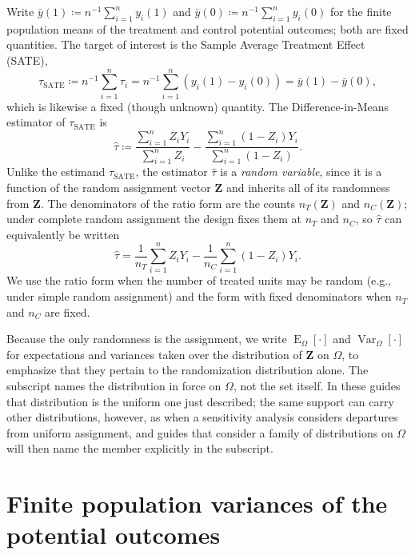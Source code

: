 \documentclass[12pt,leqno]{article}
\theoremstyle{newstyle}
\DeclareMathOperator{\E}{\mathrm{E}}
\DeclareMathOperator{\Var}{\mathrm{Var}}
\newcommand{\bZ}{\bm{Z}}   \newcommand{\bz}{\bm{z}}   %
\newcommand{\EZ}{\E_{\Omega}}    \newcommand{\VarZ}{\Var_{\Omega}}  %
\newcommand{\po}[2]{y_{#1}(#2)}     %
\newcommand{\ybar}[1]{\bar{y}(#1)}  %
\newcommand{\tauS}{\tau_{\text{SATE}}}
\newcommand{\tauhat}{\hat{\tau}}
\begin{document}
Write $\ybar{1} \coloneqq n^{-1} \sum_{i = 1}^n \po{i}{1}$ and $\ybar{0} \coloneqq n^{-1} \sum_{i = 1}^n \po{i}{0}$ for the finite population means of the treatment and control potential outcomes; both are fixed quantities. The target of interest is the Sample Average Treatment Effect (SATE),
\begin{equation*}
\tauS \coloneqq n^{-1} \sum \limits_{i = 1}^n \tau_i = n^{-1} \sum \limits_{i = 1}^n \left(\po{i}{1} - \po{i}{0}\right) = \ybar{1} - \ybar{0},
\end{equation*}
which is likewise a fixed (though unknown) quantity. The Difference-in-Means estimator of $\tauS$ is
\begin{equation*}
\tauhat \coloneqq \dfrac{\sum \limits_{i = 1}^n Z_i Y_i}{\sum\limits_{i = 1}^n Z_i}  - \dfrac{\sum \limits_{i = 1}^n \left(1 - Z_i\right) Y_i}{\sum\limits_{i = 1}^n \left(1 - Z_i\right)}.
\end{equation*}
Unlike the estimand $\tauS$, the estimator $\tauhat$ is a \textit{random variable}, since it is a function of the random assignment vector $\bZ$ and inherits all of its randomness from $\bZ$. The denominators of the ratio form are the counts $n_T(\bZ)$ and $n_C(\bZ)$; under complete random assignment the design fixes them at $n_T$ and $n_C$, so $\tauhat$ can equivalently be written
\begin{equation*}
\tauhat = \dfrac{1}{n_T} \sum \limits_{i = 1}^n Z_i Y_i - \dfrac{1}{n_C} \sum \limits_{i = 1}^n \left(1 - Z_i\right) Y_i.
\end{equation*}
We use the ratio form when the number of treated units may be random (e.g., under simple random assignment) and the form with fixed denominators when $n_T$ and $n_C$ are fixed.

Because the only randomness is the assignment, we write $\EZ[\cdot]$ and $\VarZ[\cdot]$ for expectations and variances taken over the distribution of $\bZ$ on $\Omega$, to emphasize that they pertain to the randomization distribution alone. The subscript names the distribution in force on $\Omega$, not the set itself. In these guides that distribution is the uniform one just described; the same support can carry other distributions, however, as when a sensitivity analysis considers departures from uniform assignment, and guides that consider a family of distributions on $\Omega$ will then name the member explicitly in the subscript.

\section{Finite population variances of the potential outcomes}
\end{document}
